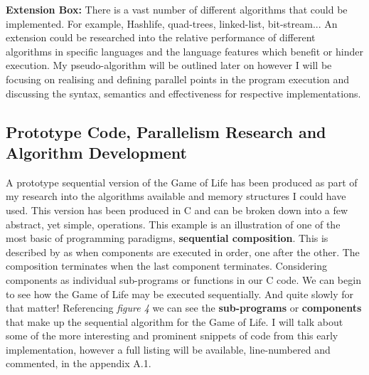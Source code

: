 \documentclass[11pt]{article} %
\begin{document}
\begin{mdframed}
{\bf Extension Box:} There is a vast number of different algorithms that could be implemented. For example, Hashlife, quad-trees, linked-list, bit-stream... An extension could be researched into the relative performance of different algorithms in specific languages and the language features which benefit or hinder execution. My pseudo-algorithm will be outlined later on however I will be focusing on realising and defining parallel points in the program execution and discussing the syntax, semantics and effectiveness for respective implementations. 
\end{mdframed} 
\subsection{Prototype Code, Parallelism Research and Algorithm Development}
A prototype sequential version of the Game of Life has been produced as part of my research into the algorithms available and memory structures I could have used. This version has been produced in C and can be broken down into a few abstract, yet simple, operations. This example is an illustration of one of the most basic of programming paradigms, {\bf sequential composition}. This is described by \cite[Chandry and Taylor, p68]{ref9} as when components are executed in order, one after the other. The composition terminates when the last component terminates. Considering components as individual sub-programs or functions in our C code. We can begin to see how the Game of Life may be executed sequentially. And quite slowly for that matter! Referencing {\it figure 4} we can see the {\bf sub-programs} or {\bf components} that make up the sequential algorithm for the Game of Life. I will talk about some of the more interesting and prominent snippets of code from this early implementation, however a full listing will be available, line-numbered and commented, in the appendix A.1.\\
\end{document}
